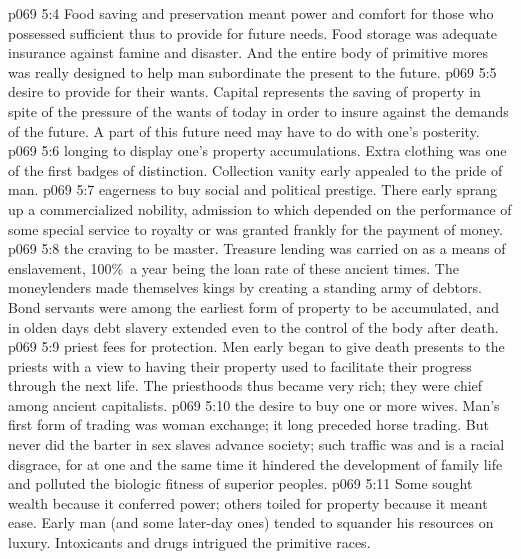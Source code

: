 \vs p069 5:4 \bibnobreakspace {} Food saving and preservation meant power and comfort for those who possessed sufficient  thus to provide for future needs. Food storage was adequate insurance against famine and disaster. And the entire body of primitive mores was really designed to help man subordinate the present to the future.
\vs p069 5:5 \bibnobreakspace {} desire to provide for their wants. Capital represents the saving of property in spite of the pressure of the wants of today in order to insure against the demands of the future. A part of this future need may have to do with one’s posterity.
\vs p069 5:6 \bibnobreakspace {} longing to display one’s property accumulations. Extra clothing was one of the first badges of distinction. Collection vanity early appealed to the pride of man.
\vs p069 5:7 \bibnobreakspace {} eagerness to buy social and political prestige. There early sprang up a commercialized nobility, admission to which depended on the performance of some special service to royalty or was granted frankly for the payment of money.
\vs p069 5:8 \bibnobreakspace {} the craving to be master. Treasure lending was carried on as a means of enslavement, 100\%\ a year being the loan rate of these ancient times. The moneylenders made themselves kings by creating a standing army of debtors. Bond servants were among the earliest form of property to be accumulated, and in olden days debt slavery extended even to the control of the body after death.
\vs p069 5:9 \bibnobreakspace {} priest fees for protection. Men early began to give death presents to the priests with a view to having their property used to facilitate their progress through the next life. The priesthoods thus became very rich; they were chief among ancient capitalists.
\vs p069 5:10 \bibnobreakspace {} the desire to buy one or more wives. Man’s first form of trading was woman exchange; it long preceded horse trading. But never did the barter in sex slaves advance society; such traffic was and is a racial disgrace, for at one and the same time it hindered the development of family life and polluted the biologic fitness of superior peoples.
\vs p069 5:11 \bibnobreakspace {} Some sought wealth because it conferred power; others toiled for property because it meant ease. Early man (and some later\hyp{}day ones) tended to squander his resources on luxury. Intoxicants and drugs intrigued the primitive races.
